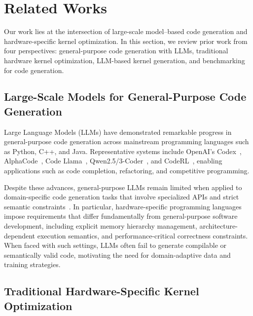 \section{Related Works}
\label{sec:relatedworks}

Our work lies at the intersection of large-scale model–based code generation and hardware-specific kernel optimization. In this section, we review prior work from four perspectives: general-purpose code generation with LLMs, traditional hardware kernel optimization, LLM-based kernel generation, and benchmarking for code generation.

\subsection{Large-Scale Models for General-Purpose Code Generation}

Large Language Models (LLMs) have demonstrated remarkable progress in general-purpose code generation across mainstream programming languages such as Python, C++, and Java. Representative systems include OpenAI's Codex~\cite{chen2021evaluating}, AlphaCode~\cite{novikov2025alphaevolve}, Code Llama~\cite{roziere2023code}, Qwen2.5/3-Coder~\cite{hui2024qwen2}, and CodeRL~\cite{le2022coderl}, enabling applications such as code completion, refactoring, and competitive programming.

Despite these advances, general-purpose LLMs remain limited when applied to domain-specific code generation tasks that involve specialized APIs and strict semantic constraints~\cite{gu2025effectiveness}. In particular, hardware-specific programming languages impose requirements that differ fundamentally from general-purpose software development, including explicit memory hierarchy management, architecture-dependent execution semantics, and performance-critical correctness constraints. When faced with such settings, LLMs often fail to generate compilable or semantically valid code, motivating the need for domain-adaptive data and training strategies.


\subsection{Traditional Hardware-Specific Kernel Optimization}


